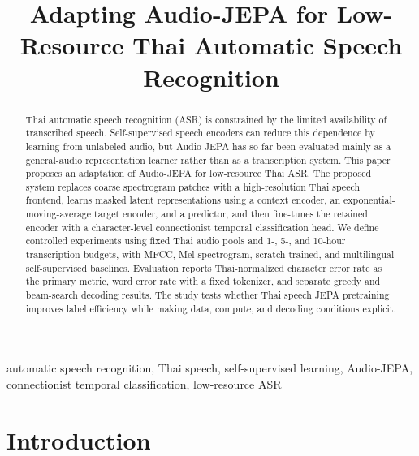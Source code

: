 \documentclass[conference]{IEEEtran}
\begin{document}
\title{Adapting Audio-JEPA for Low-Resource Thai Automatic Speech Recognition}

\author{
}

\maketitle

\begin{abstract}
Thai automatic speech recognition (ASR) is constrained by the limited availability of transcribed speech. Self-supervised speech encoders can reduce this dependence by learning from unlabeled audio, but Audio-JEPA has so far been evaluated mainly as a general-audio representation learner rather than as a transcription system. This paper proposes an adaptation of Audio-JEPA for low-resource Thai ASR. The proposed system replaces coarse spectrogram patches with a high-resolution Thai speech frontend, learns masked latent representations using a context encoder, an exponential-moving-average target encoder, and a predictor, and then fine-tunes the retained encoder with a character-level connectionist temporal classification head. We define controlled experiments using fixed Thai audio pools and 1-, 5-, and 10-hour transcription budgets, with MFCC, Mel-spectrogram, scratch-trained, and multilingual self-supervised baselines. Evaluation reports Thai-normalized character error rate as the primary metric, word error rate with a fixed tokenizer, and separate greedy and beam-search decoding results. The study tests whether Thai speech JEPA pretraining improves label efficiency while making data, compute, and decoding conditions explicit.
\end{abstract}

\begin{IEEEkeywords}
automatic speech recognition, Thai speech, self-supervised learning, Audio-JEPA, connectionist temporal classification, low-resource ASR
\end{IEEEkeywords}

\section{Introduction}
\end{document}

